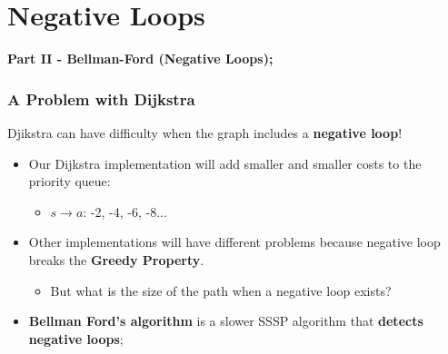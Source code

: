 \section{Negative Loops}

\begin{frame}
  \begin{center}
    {\bf Part II - Bellman-Ford (Negative Loops);}
  \end{center}
\end{frame}

\begin{frame}
  \frametitle{A Problem with Dijkstra}

    \begin{block}{}
      Djikstra can have difficulty when the graph includes a {\bf negative loop}!
    \end{block}

    \begin{center}
    \end{center}

    \begin{itemize}
    \item Our Dijkstra implementation will add smaller and smaller costs to the priority queue:
    \begin{itemize}
      \item $s \to a$: -2, -4, -6, -8...
    \end{itemize}

    \item Other implementations will have different problems because negative loop breaks the {\bf Greedy Property}.
    \begin{itemize}
      \item But what is the size of the path when a negative loop exists?
    \end{itemize}

    \item {\bf Bellman Ford's algorithm} is a slower SSSP algorithm that {\bf detects negative loops};
    \end{itemize}
\end{frame}

